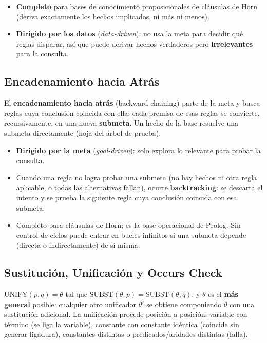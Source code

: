 \begin{itemize}
    \item \textbf{Completo} para bases de conocimiento proposicionales de cláusulas de Horn (deriva
    exactamente los hechos implicados, ni más ni menos).
    \item \textbf{Dirigido por los datos} (\textit{data-driven}): no usa la meta para decidir qué
    reglas disparar, así que puede derivar hechos verdaderos pero \textbf{irrelevantes} para la
    consulta.
\end{itemize}

\subsection{Encadenamiento hacia Atrás}

El \textbf{encadenamiento hacia atrás} (backward chaining) parte de la meta y busca reglas cuya
conclusión coincida con ella; cada premisa de esas reglas se convierte, recursivamente, en una nueva
\textbf{submeta}. Un hecho de la base resuelve una submeta directamente (hoja del árbol de prueba).

\begin{itemize}
    \item \textbf{Dirigido por la meta} (\textit{goal-driven}): solo explora lo relevante para probar
    la consulta.
    \item Cuando una regla no logra probar una submeta (no hay hechos ni otra regla aplicable, o
    todas las alternativas fallan), ocurre \textbf{backtracking}: se descarta el intento y se prueba
    la siguiente regla cuya conclusión coincida con esa submeta.
    \item Completo para cláusulas de Horn; es la base operacional de Prolog. Sin control de ciclos
    puede entrar en bucles infinitos si una submeta depende (directa o indirectamente) de sí misma.
\end{itemize}

\subsection{Sustitución, Unificación y Occurs Check}

\begin{definition}
$\text{UNIFY}(p,q) = \theta$ tal que $\text{SUBST}(\theta, p) = \text{SUBST}(\theta, q)$, y $\theta$
es el \textbf{más general} posible: cualquier otro unificador $\theta'$ se obtiene componiendo
$\theta$ con una sustitución adicional. La unificación procede posición a posición: variable con
término (se liga la variable), constante con constante idéntica (coincide sin generar ligadura),
constantes distintas o predicados/aridades distintas (falla).
\end{definition}

